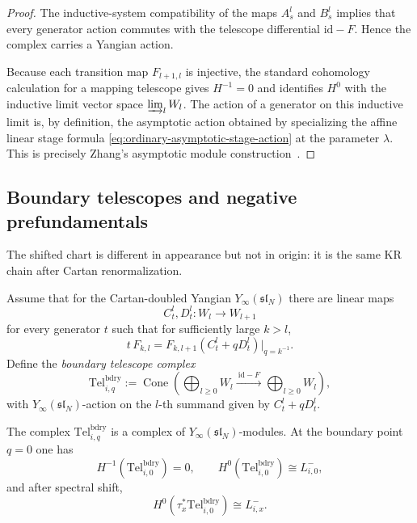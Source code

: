 \begin{proof}
The inductive-system compatibility of the maps $A_s^l$ and $B_s^l$ implies
that every generator action commutes with the telescope differential
$\mathrm{id}-F$.  Hence the complex carries a Yangian action.

Because each transition map $F_{l+1,l}$ is injective, the standard
cohomology calculation for a mapping telescope gives
$H^{-1}=0$ and identifies $H^0$ with the inductive limit vector space
$\varinjlim_l W_l$.  The action of a generator on this inductive limit is,
by definition, the asymptotic action obtained by specializing the affine
linear stage formula \eqref{eq:ordinary-asymptotic-stage-action} at the
parameter $\lambda$.  This is precisely Zhang's asymptotic module
construction~\cite{Zhang24}.
\end{proof}

\subsection{Boundary telescopes and negative prefundamentals}

The shifted chart is different in appearance but not in origin: it is the
same KR chain after Cartan renormalization.

\begin{definition}
\label{def:boundary-telescope}
Assume that for the Cartan-doubled Yangian $Y_\infty(\mathfrak{sl}_N)$
there are linear maps
\begin{equation}
C_t^l,D_t^l:W_l\longrightarrow W_{l+1}
\end{equation}
for every generator $t$ such that for sufficiently large $k>l$,
\begin{equation}
\label{eq:boundary-stage-action}
t\,F_{k,l}=F_{k,l+1}(C_t^l+qD_t^l)\big|_{q=k^{-1}}.
\end{equation}
Define the \emph{boundary telescope complex}
\begin{equation}
\mathrm{Tel}^{\mathrm{bdry}}_{i,q}
:=
\operatorname{Cone}\!\left(
\bigoplus_{l\ge 0}W_l
\xrightarrow{\ \mathrm{id}-F\ }
\bigoplus_{l\ge 0}W_l
\right),
\end{equation}
with $Y_\infty(\mathfrak{sl}_N)$-action on the $l$-th summand given by
$C_t^l+qD_t^l$.
\end{definition}

\begin{theorem}
\ClaimStatusProvedHere
\label{thm:derived-realization-negative-prefundamental}
The complex $\mathrm{Tel}^{\mathrm{bdry}}_{i,q}$ is a complex of
$Y_\infty(\mathfrak{sl}_N)$-modules.  At the boundary point $q=0$ one has
\begin{equation}
H^{-1}(\mathrm{Tel}^{\mathrm{bdry}}_{i,0})=0,
\qquad
H^0(\mathrm{Tel}^{\mathrm{bdry}}_{i,0})\cong L^-_{i,0},
\end{equation}
and after spectral shift,
\begin{equation}
H^0(\tau_x^*\mathrm{Tel}^{\mathrm{bdry}}_{i,0})\cong L^-_{i,x}.
\end{equation}
\end{theorem}

